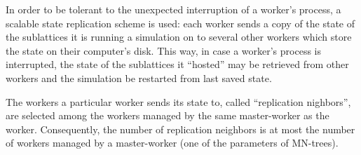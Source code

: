 In order to be tolerant to the unexpected interruption of a worker's process, a
scalable state replication scheme is used: each worker sends a copy of the
state of the sublattices it is running a simulation on to several other workers
which store the state on their computer's disk. This way, in case a worker's
process is interrupted, the state of the sublattices it ``hosted'' may be
retrieved from other workers and the simulation be restarted from last saved
state.

The workers a particular worker sends its state to, called ``replication
nighbors'', are selected among the workers managed by the same master-worker
as the worker. Consequently, the number of replication neighbors is at most the
number of workers managed by a master-worker (one of the parameters of
MN-trees).

